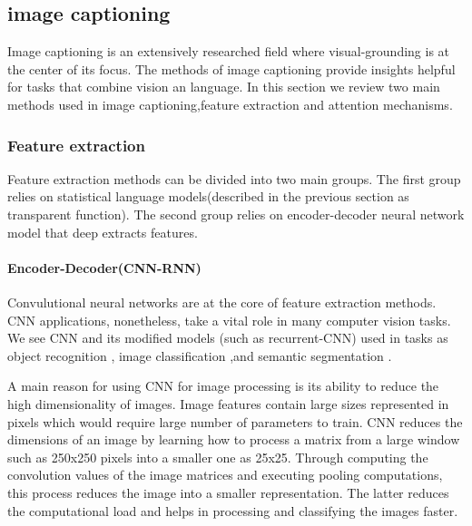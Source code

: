






\subsection{image captioning}

Image captioning is an extensively researched field where visual-grounding is at the  center of its focus. The methods of image captioning provide insights helpful for tasks that combine vision an language. In this section we review two main methods used in image captioning,feature extraction and attention mechanisms.   


\subsubsection{Feature extraction}

Feature extraction methods can be divided into two main groups. The first group relies on statistical language models(described in the previous section as transparent function). The second group relies on encoder-decoder neural network model that deep extracts features.\cite{Imagecap}

\paragraph{Encoder-Decoder(CNN-RNN)}



Convulutional neural networks are at the core of feature extraction methods. CNN applications, nonetheless, take a vital role in many computer vision tasks. We see CNN and its modified models (such as recurrent-CNN) used in tasks as object recognition \cite{liang2015recurrent} \cite{objdet} \cite{Ren2015FasterRT} , image classification \cite{simonyan2014very} \cite{imclassfication},and  semantic segmentation \cite{hariharan2015hypercolumns} \cite{imseg}. 

A main reason for using CNN for image processing  is its ability to reduce the high dimensionality of images. Image features contain large sizes represented in pixels which would require large number of parameters to train. CNN reduces the dimensions of an image by learning how to process a matrix from a large window such as 250x250 pixels into a smaller one as 25x25. Through computing the convolution values of the image matrices and executing pooling computations, this process reduces the image into a smaller representation. The latter reduces the computational load and helps in processing and classifying the images faster.   


